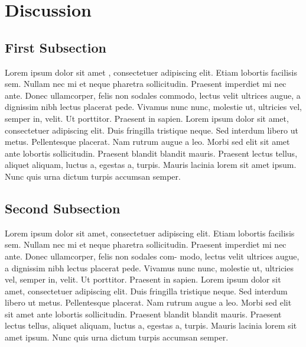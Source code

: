 \documentclass[
  9pt,
  twocolumn,
  twoside]{turbo}%
\begin{document}
\hypertarget{sec-discussion}{%
\section{Discussion}\label{sec-discussion}}

\hypertarget{first-subsection}{%
\subsection{First Subsection}\label{first-subsection}}

Lorem ipsum dolor sit amet \citep{CameronTrivedi2013}, consectetuer
adipiscing elit. Etiam lobortis facilisis sem. Nullam nec mi et neque
pharetra sollicitudin. Praesent imperdiet mi nec ante. Donec
ullamcorper, felis non sodales commodo, lectus velit ultrices augue, a
dignissim nibh lectus placerat pede. Vivamus nunc nunc, molestie ut,
ultricies vel, semper in, velit. Ut porttitor. Praesent in sapien. Lorem
ipsum dolor sit amet, consectetuer adipiscing elit. Duis fringilla
tristique neque. Sed interdum libero ut metus. Pellentesque placerat.
Nam rutrum augue a leo. Morbi sed elit sit amet ante lobortis
sollicitudin. Praesent blandit blandit mauris. Praesent lectus tellus,
aliquet aliquam, luctus a, egestas a, turpis. Mauris lacinia lorem sit
amet ipsum. Nunc quis urna dictum turpis accumsan semper.

\hypertarget{second-subsection}{%
\subsection{Second Subsection}\label{second-subsection}}

Lorem ipsum dolor sit amet, consectetuer adipiscing elit. Etiam lobortis
facilisis sem. Nullam nec mi et neque pharetra sollicitudin. Praesent
imperdiet mi nec ante. Donec ullamcorper, felis non sodales com- modo,
lectus velit ultrices augue, a dignissim nibh lectus placerat pede.
Vivamus nunc nunc, molestie ut, ultricies vel, semper in, velit. Ut
porttitor. Praesent in sapien. Lorem ipsum dolor sit amet, consectetuer
adipiscing elit. Duis fringilla tristique neque. Sed interdum libero ut
metus. Pellentesque placerat. Nam rutrum augue a leo. Morbi sed elit sit
amet ante lobortis sollicitudin. Praesent blandit blandit mauris.
Praesent lectus tellus, aliquet aliquam, luctus a, egestas a, turpis.
Mauris lacinia lorem sit amet ipsum. Nunc quis urna dictum turpis
accumsan semper.


  
\end{document}
